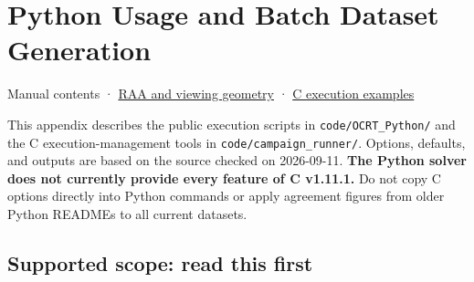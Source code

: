 \chapter{Python Usage and Batch Dataset Generation}
\label{chap:06_python_batch}
\begingroup\setlength{\parskip}{4pt}
Manual contents · \hyperref[chap:01_concepts_geometry]{RAA and viewing geometry} · \hyperref[chap:04_examples]{C execution examples}

This appendix describes the public execution scripts in \texttt{code/\allowbreak{}OCRT\_\allowbreak{}Python/\allowbreak{}} and the C execution-management tools in \texttt{code/\allowbreak{}campaign\_\allowbreak{}runner/\allowbreak{}}. Options, defaults, and outputs are based on the source checked on 2026-09-11. \textbf{The Python solver does not currently provide every feature of C v1.11.1.} Do not copy C options directly into Python commands or apply agreement figures from older Python READMEs to all current datasets.

\section{Supported scope: read this first}
\label{sec:auto:06_python_batch:1}

